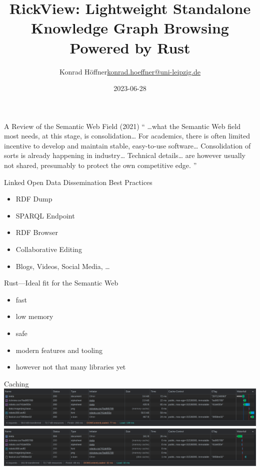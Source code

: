 \documentclass[14pt,aspectratio=1610]{beamer}
\date{2023-06-28}
\author{\texorpdfstring{Konrad Höffner\newline\url{konrad.hoeffner@uni-leipzig.de}}{Konrad Höffner}}
\title{RickView: Lightweight Standalone Knowledge Graph Browsing Powered by Rust}
\subtitle{}
\begin{document}
\begin{frame}
\titlepage
\end{frame}

\begin{frame}{A Review of the Semantic Web Field (2021)}
\enquote{
\ldots{}what the Semantic Web field most needs, at this stage, is consolidation\ldots
For academics, there is often limited incentive to develop and maintain stable, easy-to-use software\ldots
Consolidation of sorts is already happening in industry\ldots
Technical details\ldots{} are however usually not shared, presumably to protect the own competitive edge.
}
\end{frame}

\begin{frame}{Linked Open Data Dissemination Best Practices}
\begin{itemize}
\item RDF Dump
\item SPARQL Endpoint
\item RDF Browser
\pause
\item Collaborative Editing
\item Blogs, Videos, Social Media, \ldots
\end{itemize}
\end{frame}

\begin{frame}{Rust---Ideal fit for the Semantic Web}
\begin{itemize}
\item fast
\item low memory
\item safe
\item modern features and tooling
\pause
\item however not that many libraries yet
\end{itemize}
\end{frame}

{
\begin{frame}[plain]{Caching}
\centering\includegraphics[width=\textwidth]{img/nocache.png}\\
\hspace{2em}
\centering\includegraphics[width=\textwidth]{img/cache.png}
\end{frame}
\restoregeometry
}
\end{document}
